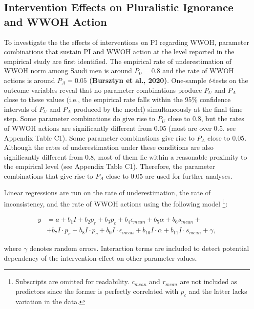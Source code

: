 \documentclass[
  11pt,
]{article}
\begin{document}
\hypertarget{intervention-effects-on-pluralistic-ignorance-and-wwoh-action}{%
\subsection{Intervention Effects on Pluralistic Ignorance and WWOH
Action}\label{intervention-effects-on-pluralistic-ignorance-and-wwoh-action}}

To investigate the the effects of interventions on PI regarding WWOH,
parameter combinations that sustain PI and WWOH action at the level
reported in the empirical study are first identified. The empirical rate
of underestimation of WWOH norm among Saudi men is around \(P_U = 0.8\)
and the rate of WWOH actions is around \(P_A = 0.05\) \textbf{(Bursztyn
et al., 2020)}. One-sample \emph{t}-tests on the outcome variables
reveal that no parameter combinations produce \(P_U\) and \(P_A\) close
to these values (i.e., the empirical rate falls within the 95\%
confidence intervals of \(P_U\) and \(P_A\) produced by the model)
simultaneously at the final time step. Some parameter combinations do
give rise to \(P_U\) close to 0.8, but the rates of WWOH actions are
significantly different from 0.05 (most are over 0.5, see Appendix Table
C1). Some parameter combinations give rise to \(P_A\) close to 0.05.
Although the rates of underestimation under these conditions are also
significantly different from 0.8, most of them lie within a reasonable
proximity to the empirical level (see Appendix Table C1). Therefore, the
parameter combinations that give rise to \(P_A\) close to 0.05 are used
for further analyses.

Linear regressions are run on the rate of underestimation, the rate of
inconsistency, and the rate of WWOH actions using the following model
\footnote{Subscripts are omitted for readability. $c_{mean}$ and $r_{mean}$ are not included as predictors since the former is perfectly correlated with $p_c$ and the latter lacks variation in the data.}:

\begin{equation}
  \begin{aligned}
  y &= a + b_1I + b_2p_r + b_3p_c + b_4\epsilon_{mean} + b_5\alpha + b_6s_{mean} +\\
  &+ b_7I \cdot p_r + b_{8}I \cdot p_c + b_{9}I \cdot \epsilon_{mean} + b_{10}I \cdot \alpha + b_{11}I \cdot s_{mean} + \gamma,
  \end{aligned}
\end{equation}

where \(\gamma\) denotes random errors. Interaction terms are included
to detect potential dependency of the intervention effect on other
parameter values.
\end{document}
